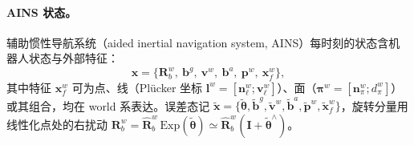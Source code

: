\paragraph{AINS 状态。}
辅助惯性导航系统（aided inertial navigation system, AINS）每时刻的状态含机器人状态与外部特征\cite{carlone2026handbook}：
\begin{equation}
  \boldsymbol{x}=\{\mathbf{R}^w_b,\ \mathbf{b}^g,\ \mathbf{v}^w,\ \mathbf{b}^a,\ \mathbf{p}^w,\ \boldsymbol{x}^w_f\},
  \label{eq:vio-ains-state}
\end{equation}
其中特征 $\boldsymbol{x}^w_f$ 可为点、线（Plücker 坐标 $\mathbf{l}^w=[\mathbf{n}_\ell^w;\mathbf{v}_\ell^w]$）、面（$\boldsymbol{\pi}^w=[\mathbf{n}_\pi^w;d_\pi^w]$）或其组合，均在 world 系表达。误差态记 $\tilde{\boldsymbol{x}}=\{\tilde{\boldsymbol{\theta}},\tilde{\mathbf{b}}^g,\tilde{\mathbf{v}}^w,\tilde{\mathbf{b}}^a,\tilde{\mathbf{p}}^w,\tilde{\boldsymbol{x}}^w_f\}$，旋转分量用线性化点处的右扰动 $\mathbf{R}^w_b=\hat{\mathbf{R}}^w_b\,\mathrm{Exp}(\tilde{\boldsymbol{\theta}})\simeq\hat{\mathbf{R}}^w_b(\mathbf{I}+\tilde{\boldsymbol{\theta}}^\wedge)$。

